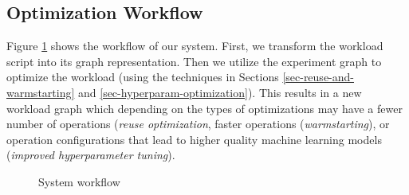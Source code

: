 \subsection{Optimization Workflow}
Figure \ref{fig-system-workflow} shows the workflow of our system.
First, we transform the workload script into its graph representation.
Then we utilize the experiment graph to optimize the workload (using the techniques in Sections \ref{sec-reuse-and-warmstarting} and \ref{sec-hyperparam-optimization}).
This results in a new workload graph which depending on the types of optimizations may have a fewer number of operations (\textit{reuse optimization}, faster operations (\textit{warmstarting}), or operation configurations that lead to higher quality machine learning models (\textit{improved hyperparameter tuning}).
\begin{figure}
\centering

\caption{System workflow}
\label{fig-system-workflow}
\end{figure}
